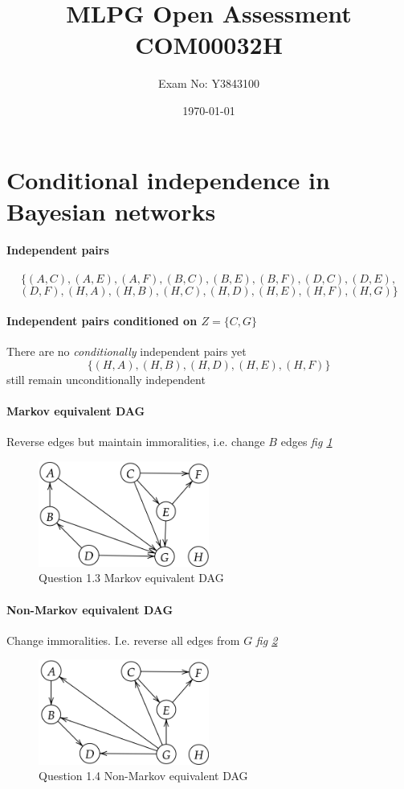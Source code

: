 \documentclass[11pt,a4paper,titlepage]{article}
\title{MLPG Open Assessment COM00032H}
\author{Exam No: Y3843100}
\date{\today}
\begin{document}
\maketitle


\section{Conditional independence in Bayesian networks}

\paragraph{Independent pairs}
\[\{(A,C),(A,E),(A,F),(B,C),(B,E),(B,F),(D,C),(D,E),\]
  \[(D,F),(H,A),(H,B),(H,C),(H,D),(H,E),(H,F),(H,G)\}\]

\paragraph{Independent pairs conditioned on \(Z = \{C,G\}\)}
There are no \textit{conditionally} independent pairs yet
\[\{(H,A),(H,B),(H,D),(H,E),(H,F)\}\]
still remain unconditionally independent

\paragraph{Markov equivalent DAG}
Reverse edges but maintain immoralities, i.e. change \(B\) edges \textit{fig \ref{fig:1.3}}

\begin{figure}[htb]
  \centering
    \includegraphics[width=0.5\textwidth]{../q1/fig13.png}
    \caption{Question 1.3 Markov equivalent DAG}
  \label{fig:1.3}
\end{figure}

\paragraph{Non-Markov equivalent DAG}
Change immoralities. I.e. reverse all edges from \(G\) \textit{fig \ref{fig:1.4}}
\begin{figure}[htb]
  \centering
    \includegraphics[width=0.5\textwidth]{../q1/fig14.png}
    \caption{Question 1.4 Non-Markov equivalent DAG}
  \label{fig:1.4}
\end{figure}
\end{document}
